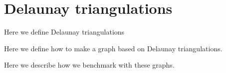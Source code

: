 \section{Delaunay triangulations}
\label{section:delaunay}
Here we define Delaunay triangulations

Here we define how to make a graph based on Delaunay triangulations.

Here we describe how we benchmark with these graphs.